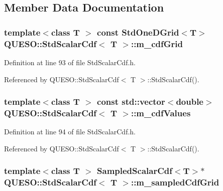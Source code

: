 \subsection{Member Data Documentation}
\hypertarget{class_q_u_e_s_o_1_1_std_scalar_cdf_a6d92d555e9042f0c203b59f3b272f878}{
\subsubsection[{m\-\_\-cdf\-Grid}]{\setlength{\rightskip}{0pt plus 5cm}template$<$class T $>$ const {\bf Std\-One\-D\-Grid}$<$T$>$ {\bf Q\-U\-E\-S\-O\-::\-Std\-Scalar\-Cdf}$<$ T $>$\-::m\-\_\-cdf\-Grid\hspace{0.3cm}{\ttfamily [protected]}}}\label{class_q_u_e_s_o_1_1_std_scalar_cdf_a6d92d555e9042f0c203b59f3b272f878}


Definition at line 93 of file Std\-Scalar\-Cdf.\-h.



Referenced by Q\-U\-E\-S\-O\-::\-Std\-Scalar\-Cdf$<$ T $>$\-::\-Std\-Scalar\-Cdf().

\hypertarget{class_q_u_e_s_o_1_1_std_scalar_cdf_ac04a45e22e2500a5ef8911e2c034364f}{
\subsubsection[{m\-\_\-cdf\-Values}]{\setlength{\rightskip}{0pt plus 5cm}template$<$class T $>$ const std\-::vector$<$double$>$ {\bf Q\-U\-E\-S\-O\-::\-Std\-Scalar\-Cdf}$<$ T $>$\-::m\-\_\-cdf\-Values\hspace{0.3cm}{\ttfamily [protected]}}}\label{class_q_u_e_s_o_1_1_std_scalar_cdf_ac04a45e22e2500a5ef8911e2c034364f}


Definition at line 94 of file Std\-Scalar\-Cdf.\-h.



Referenced by Q\-U\-E\-S\-O\-::\-Std\-Scalar\-Cdf$<$ T $>$\-::\-Std\-Scalar\-Cdf().

\hypertarget{class_q_u_e_s_o_1_1_std_scalar_cdf_a2da9aa62766843734025cc059f817258}{
\subsubsection[{m\-\_\-sampled\-Cdf\-Grid}]{\setlength{\rightskip}{0pt plus 5cm}template$<$class T $>$ {\bf Sampled\-Scalar\-Cdf}$<$T$>$$\ast$ {\bf Q\-U\-E\-S\-O\-::\-Std\-Scalar\-Cdf}$<$ T $>$\-::m\-\_\-sampled\-Cdf\-Grid\hspace{0.3cm}{\ttfamily [protected]}}}\label{class_q_u_e_s_o_1_1_std_scalar_cdf_a2da9aa62766843734025cc059f817258}


